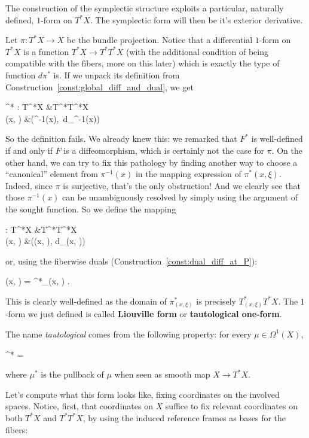 \documentclass[main.tex]{subfiles}
\begin{document}
The construction of the symplectic structure exploits a particular, naturally defined, $1$-form on $T^*X$. The symplectic form will then be it's exterior derivative.

\begin{construction}
	Let $\pi : T^*X \to X$ be the bundle projection. Notice that a differential $1$-form on $T^*X$ is a function $T^*X \to T^*T^*X$ (with the additional condition of being compatible with the fibers, more on this later) which is exactly the type of function $d\pi^*$ is. If we unpack its definition from Construction~\ref{const:global_diff_and_dual}, we get
	\begin{eqalign}
		\pi^* : T^*X &\longto T^*T^*X\\
		(x, \xi) &\longmapsto (\pi^{-1}(x),\, \xi \circ d\pi_{\pi^{-1}(x)})
	\end{eqalign}
	So the definition fails. We already knew this: we remarked that $F^*$ is well-defined if and only if $F$ is a diffeomorphism, which is certainly not the case for $\pi$. On the other hand, we can try to fix this pathology by finding another way to choose a ``canonical'' element from $\pi^{-1}(x)$ in the mapping expression of $\pi^*(x, \xi)$. Indeed, since $\pi$ is surjective, that's the only obstruction! And we clearly see that those $\pi^{-1}(x)$ can be unambiguously resolved by simply using the argument of the sought function. So we define the mapping
	\begin{eqalign}
		\alpha : T^*X &\longto T^*T^*X\\
		(x, \xi) &\longmapsto ((x, \xi), \xi \circ d\pi_{(x, \xi)})
	\end{eqalign}
	or, using the fiberwise duals (Construction~\ref{const:dual_diff_at_P}):
	\begin{eqalign}
		\alpha(x, \xi) = \pi^*_{(x, \xi)} \xi.
	\end{eqalign}
	This is clearly well-defined as the domain of $\pi^*_{(x,\xi)}$ is precisely $T^*_{(x,\xi)} T^*X$. The $1$-form we just defined is called \textbf{Liouville form} or \textbf{tautological one-form}.
\end{construction}

The name \emph{tautological} comes from the following property: for every $\mu \in \Omega^1(X)$,
\begin{eqalign}
	\mu^* \alpha = \mu
\end{eqalign}
where $\mu^*$ is the pullback of $\mu$ when seen as smooth map $X \to T^*X$.

Let's compute what this form looks like, fixing coordinates on the involved spaces. Notice, first, that coordinates on $X$ suffice to fix relevant coordinates on both $T^*X$ and $T^*T^*X$, by using the induced reference frames as bases for the fibers:
\end{document}
